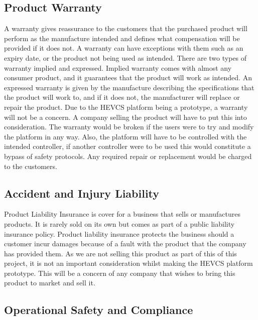 \documentclass [12pt]{article}
\begin{document}
\subsection{Product Warranty}\label{sec:Product_Warranty}

A warranty gives reassurance to the customers that the purchased product will perform as the manufacture intended and defines what compensation will be provided if it does not. \cite{Warranty} A warranty can have exceptions with them such as an expiry date, or the product not being used as intended. There are two types of warranty implied and expressed. Implied warranty comes with almost any consumer product, and it guarantees that the product will work as intended. An expressed warranty is given by the manufacture describing the specifications that the product will work to, and if it does not, the manufacturer will replace or repair the product. \cite{Warranty}
Due to the HEVCS platform being a prototype, a warranty will not be a concern. A company selling the product will have to put this into consideration. The warranty would be broken if the users were to try and modify the platform in any way. Also, the platform will have to be controlled with the intended controller, if another controller were to be used this would constitute a bypass of safety protocols. Any required repair or replacement would be charged to the customers.

\subsection{Accident and Injury Liability}\label{sec:Accident_and_Injury_Liabilty}

Product Liability Insurance is cover for a business that sells or manufactures products. It is rarely sold on its own but comes as part of a public liability insurance policy. Product liability insurance protects the business should a customer incur damages because of a fault with the product that the company has provided them. \cite{Liabilty_Insurance}  As we are not selling this product as part of this of this project, it is not an important consideration whilst making the HEVCS platform prototype. This will be a concern of any company that wishes to bring this product to market and sell it.

\subsection{Operational Safety and Compliance}\label{sec:Operational_Safety_and_Compliance}
\end{document}
